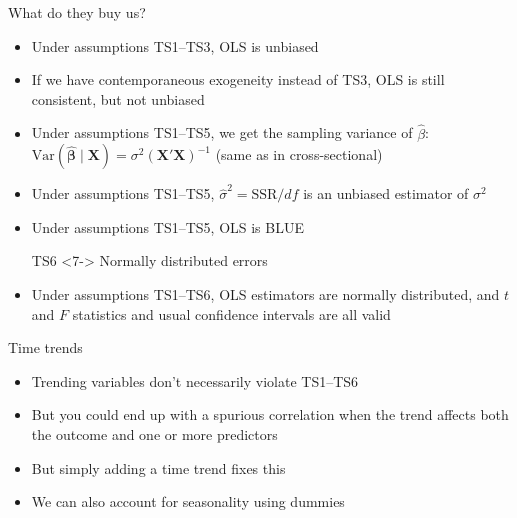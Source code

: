\documentclass[
  ignorenonframetext,
]{beamer}
\providecommand{\tightlist}{%
  \setlength{\itemsep}{0pt}\setlength{\parskip}{0pt}}
\newcommand{\setsep}{\setlength{\itemsep}{3pt}}
\newcommand{\setskip}{\setlength{\parskip}{3pt}}
\renewcommand{\tightlist}{\setsep\setskip}
\begin{document}
\begin{frame}{What do they buy us?}
\protect\hypertarget{what-do-they-buy-us}{}
\pause

\begin{itemize}[<+->]
\tightlist
\item
  Under assumptions TS1--TS3, OLS is unbiased
\item
  If we have contemporaneous exogeneity instead of TS3, OLS is still consistent, but not unbiased
\item
  Under assumptions TS1--TS5, we get the sampling variance of \(\hat{\beta}\): \(\text{Var}\left(\hat{\boldsymbol\beta}\mid\mathbf{X}\right) = \sigma^2\left(\mathbf{X'X}\right)^{-1}\) (same as in cross-sectional)
\item
  Under assumptions TS1--TS5, \(\hat{\sigma}^2 = \text{SSR}/df\) is an unbiased estimator of \(\sigma^2\)
\item
  Under assumptions TS1--TS5, OLS is BLUE
\end{itemize}

\begin{itemize}
    \setlength{\itemsep}{3pt}\setlength{\parskip}{3pt}
    \item[TS6]<7-> Normally distributed errors
\end{itemize}

\begin{itemize}
    \setlength{\itemsep}{3pt}\setlength{\parskip}{3pt}
    \item<8-> Under assumptions TS1--TS6, OLS estimators are normally distributed, and $t$ and $F$ statistics and usual confidence intervals are all valid
\end{itemize}
\end{frame}

\begin{frame}{Time trends}
\protect\hypertarget{time-trends}{}
\pause

\begin{itemize}[<+->]
\tightlist
\item
  Trending variables don't necessarily violate TS1--TS6
\item
  But you could end up with a spurious correlation when the trend affects both the outcome and one or more predictors
\item
  But simply adding a time trend fixes this
\item
  We can also account for seasonality using dummies
\end{itemize}
\end{frame}
\end{document}
